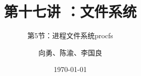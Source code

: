 


\title[第17讲]{第十七讲 ：文件系统} %
\subtitle{第5节：进程文件系统procfs}
\author{向勇、陈渝、李国良} %
\date{\today} %



\begin{frame}
\titlepage %
\end{frame}
